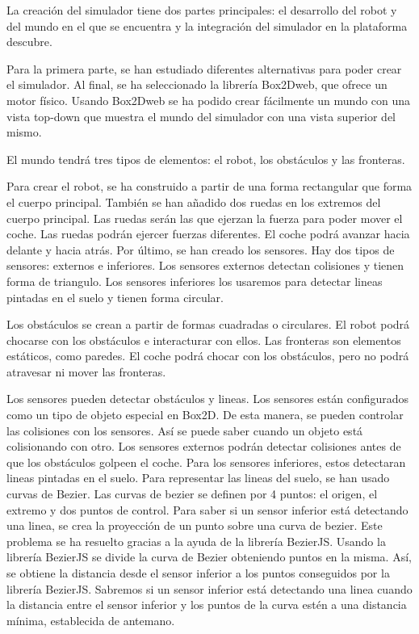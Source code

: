 
La creación del simulador tiene dos partes principales: el desarrollo del robot y del mundo en el que se encuentra y la integración del simulador en la plataforma descubre. 

Para la primera parte, se han estudiado diferentes alternativas para poder crear el simulador. Al final, se ha seleccionado la librería Box2Dweb, que ofrece un motor físico. Usando Box2Dweb se ha podido crear fácilmente un mundo con una vista top-down que muestra el mundo del simulador con una vista superior del mismo. 

El mundo tendrá tres tipos de elementos: el robot, los obstáculos y las fronteras.

Para crear el robot, se ha construido a partir de una forma rectangular que forma el cuerpo principal. También se han añadido dos ruedas en los extremos del cuerpo principal. Las ruedas serán las que ejerzan la fuerza para poder mover el coche. Las ruedas podrán ejercer fuerzas diferentes. El coche podrá avanzar hacia delante y hacia atrás. Por último, se han creado los sensores. Hay dos tipos de sensores: externos e inferiores. Los sensores externos detectan colisiones y tienen forma de triangulo. Los sensores inferiores los usaremos para detectar lineas pintadas en el suelo y tienen forma circular. 

Los obstáculos se crean a partir de formas cuadradas o circulares. El robot podrá chocarse con los obstáculos e interacturar con ellos. Las fronteras son elementos estáticos, como paredes. El coche podrá chocar con los obstáculos, pero no podrá atravesar ni mover las fronteras.


Los sensores pueden detectar obstáculos y lineas. Los sensores están configurados como un tipo de objeto especial en Box2D. De esta manera, se pueden controlar las colisiones con los sensores. Así se puede saber cuando un objeto está colisionando con otro. Los sensores externos podrán detectar colisiones antes de que los obstáculos golpeen el coche. Para los sensores inferiores, estos detectaran lineas pintadas en el suelo. Para representar las lineas del suelo, se han usado curvas de Bezier. Las curvas de bezier se definen por 4 puntos: el origen, el extremo y dos puntos de control. Para saber si un sensor inferior está detectando una linea, se crea la proyección de un punto sobre una curva de bezier. Este problema se ha resuelto gracias a la ayuda de la librería BezierJS. Usando la librería BezierJS se divide la curva de Bezier obteniendo puntos en la misma. Así, se obtiene la distancia desde el sensor inferior a los puntos conseguidos por la librería BezierJS. Sabremos si un sensor inferior está detectando una linea cuando la distancia entre el sensor inferior y los puntos de la curva estén a una distancia mínima, establecida de antemano.

